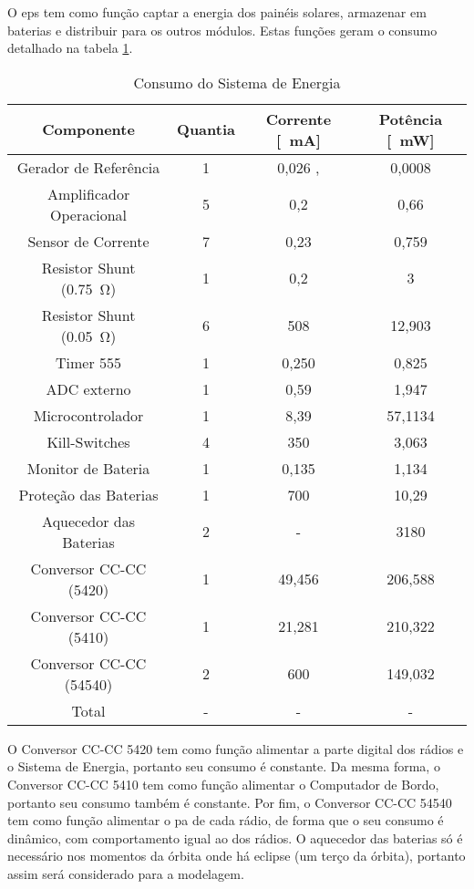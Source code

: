 O \gls{eps} tem como função captar a energia dos painéis solares, armazenar em baterias e distribuir para os outros módulos. Estas funções geram o consumo detalhado na tabela \ref{consumo_eps}.

\begin{table}[!htpb]
\centering
\begin{tabular}{c c c c}
\\ \hline
Componente & Quantia & Corrente [\SI{}{\milli\ampere}] & Potência [\SI{}{\milli\watt}] \\ \hline \hline
Gerador de Referência & 1 & 0,026 \cite{ref5030}, \cite{msp430f6659} & 0,0008 \cite{ref5030} \\
Amplificador Operacional & 5 & 0,2 \cite{tlv341} & 0,66 \\
Sensor de Corrente & 7 & 0,23 \cite{max9934} & 0,759 \\
Resistor Shunt (\SI{0,75}{\ohm}) & 1 & 0,2 & 3 \\
Resistor Shunt (\SI{0,05}{\ohm}) & 6 & 508 & 12,903 \\
Timer 555 & 1 & 0,250 \cite{lmc555} & 0,825 \\
ADC externo & 1 & 0,59 \cite{ads1248} & 1,947 \\
Microcontrolador & 1 & 8,39 \cite{msp430f6659} & 57,1134 \cite{msp430f6659} \\
Kill-Switches & 4 & 350 & 3,063 \cite{si4403} \\
Monitor de Bateria & 1 & 0,135 \cite{ds2775} & 1,134 \cite{ds2775} \\
Proteção das Baterias & 1 & 700 & 10,29 \cite{fds6898az} \\
Aquecedor das Baterias & 2 & - & 3180\\
Conversor CC-CC (5420) & 1 & 49,456 & 206,588 \cite{tps5420} \\
Conversor CC-CC (5410) & 1 & 21,281 & 210,322 \cite{tps5410} \\
Conversor CC-CC (54540) & 2 & 600 & 149,032 \cite{tps54540} \\ \hline
Total & - & - & - \\ \hline
\end{tabular}
\caption{Consumo do Sistema de Energia}
\label{consumo_eps}
\end{table}

O Conversor CC-CC 5420 tem como função alimentar a parte digital dos rádios e o Sistema de Energia, portanto seu consumo é constante. Da mesma forma, o Conversor CC-CC 5410 tem como função alimentar o Computador de Bordo, portanto seu consumo também é constante. Por fim, o Conversor CC-CC 54540 tem como função alimentar o \gls{pa} de cada rádio, de forma que o seu consumo é dinâmico, com comportamento igual ao dos rádios. O aquecedor das baterias só é necessário nos momentos da órbita onde há eclipse (um terço da órbita), portanto assim será considerado para a modelagem.

